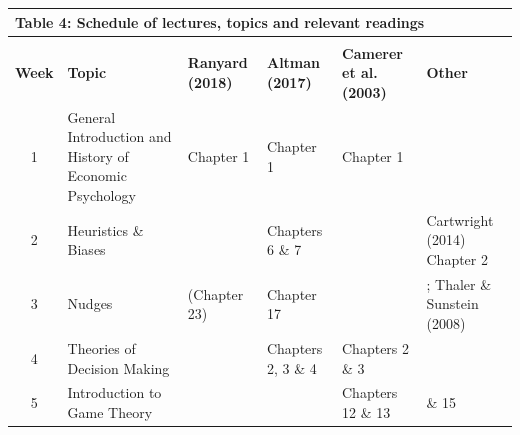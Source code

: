 \documentclass[
  x11names]{article}
\begin{document}
\begin{table}[h!]
  \begin{center}
    \begin{tabular}{| c | >{\arraybackslash}m{5cm} | >{\centering\arraybackslash}m{1.75cm} | >{\centering\arraybackslash}m{1.75cm} | >{\centering\arraybackslash}m{1.75cm} | >{\centering\arraybackslash}m{3cm} | }
    \multicolumn{6}{l}{\textbf{Table 4:} Schedule of lectures, topics and relevant readings} \\
    \hline
    & & \multicolumn{4}{c|}{\textbf{Readings}} \\ \hline
    \textbf{Week} & \textbf{Topic} &                      \textbf{Ranyard (2018)} & \textbf{Altman (2017)} & \textbf{Camerer et al. (2003)} & \textbf{Other}  \\ \hline
      1   & General Introduction and History of Economic Psychology & Chapter 1    & Chapter 1          & Chapter 1           &  \href{https://learn.ul.ie//content/enforced/69006-PS4168_SEM1_2025_6/1.Resources/Cartwright_2014_Chapter1.pdf}{\color{blue}{Cartwright (2014) Chapter 1}\color{black}} \\ \hline
      2   & Heuristics \& Biases                                    & \href{https://learn.ul.ie//content/enforced/69006-PS4168_SEM1_2025_6/1.Resources/Ranyard_2018_Chapter2.pdf}{\color{blue}{Chapter 2}\color{black}}    & Chapters 6 \& 7    &                     & Cartwright (2014) Chapter 2     \\ \hline
      3   & Nudges                                                   & (Chapter 23) & Chapter 17         &                     & \href{https://learn.ul.ie//content/enforced/69006-PS4168_SEM1_2025_6/1.Resources/Frantz_2016_Chapter8.pdf}{\color{blue}{Frantz et al., (2016) Chapter 8}\color{black}}; Thaler \& Sunstein (2008) \\ \hline
      4   & Theories of Decision Making                  & \href{https://learn.ul.ie//content/enforced/69006-PS4168_SEM1_2025_6/1.Resources/Ranyard_2018_Chapter2.pdf}{\color{blue}{Chapter 2}\color{black}}    & Chapters 2, 3 \& 4 & Chapters 2 \& 3     &                                 \\ \hline
      5   & Introduction to Game Theory            &              & \href{https://learn.ul.ie//content/enforced/69006-PS4168_SEM1_2025_6/1.Resources/Altman_2017_Chapter32.pdf}{\color{blue}{Chapter 32}\color{black}}         & Chapters 12 \& 13   & \href{https://learn.ul.ie//content/enforced/69006-PS4168_SEM1_2025_6/1.Resources/Antonides_1996_Chapter14.pdf}{\color{blue}{Antonides, (1996) Chapters 14}\color{black}}   \& 15 \\ \hline

\end{tabular}
\end{center}
\end{table}
\end{document}
